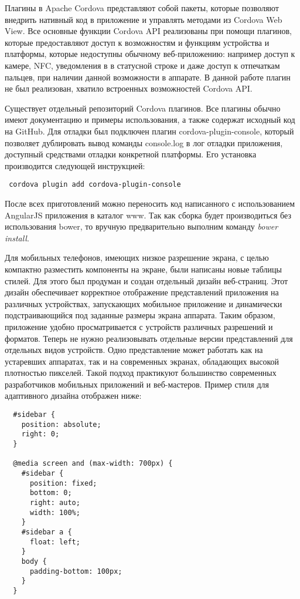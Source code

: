 Плагины в Apache Cordova представляют собой пакеты, которые позволяют внедрить нативный код в приложение и управлять методами из Cordova Web View. Все основные функции Cordova API реализованы при помощи плагинов, которые предоставляют доступ к возможностям и функциям устройства и платформы, которые недоступны обычному веб-приложению: например доступ к камере, NFC, уведомления в в статусной строке и даже доступ к отпечаткам пальцев, при наличии данной возможности в аппарате\cite{android:publish}. В данной работе плагин не был реализован, хватило встроенных возможностей Cordova API.

Существует отдельный репозиторий Cordova плагинов. Все плагины обычно имеют документацию и примеры использования, а также содержат исходный код на GitHub. Для отладки был подключен плагин cordova-plugin-console, который позволяет дублировать вывод команды console.log в лог отладки приложения, доступный средствами отладки конкретной платформы. Его установка производится следующей инструкцией:
\begin{lstlisting}
 cordova plugin add cordova-plugin-console
\end{lstlisting}

После всех приготовлений можно переносить код написанного с использованием AngularJS приложения в каталог www. Так как сборка будет производиться без использования bower, то вручную предварительно выполним команду \textit{bower install}. 

Для мобильных телефонов, имеющих низкое разрешение экрана, с целью компактно разместить компоненты на экране, были написаны новые таблицы стилей. Для этого был продуман и создан отдельный дизайн веб-страниц. Этот дизайн обеспечивает корректное отображение представлений приложения на различных устройствах, запускающих мобильное приложение и динамически подстраивающийся под заданные размеры экрана аппарата. Таким образом, приложение удобно просматривается с устройств различных разрешений и форматов. Теперь не нужно реализовывать отдельные версии представлений для отдельных видов устройств. Одно представление может работать как на устаревших аппаратах, так и на современных экранах, обладающих высокой плотностью пикселей. Такой подход практикуют большинство современных разработчиков мобильных приложений и веб-мастеров. Пример стиля для адаптивного дизайна отображен ниже:
\begin{lstlisting}
  #sidebar {
    position: absolute;
    right: 0;
  }

  @media screen and (max-width: 700px) {
    #sidebar {
      position: fixed;
      bottom: 0;
      right: auto;
      width: 100%;
    }
    #sidebar a {
      float: left;
    }
    body {
      padding-bottom: 100px;
    }
  }
\end{lstlisting}

